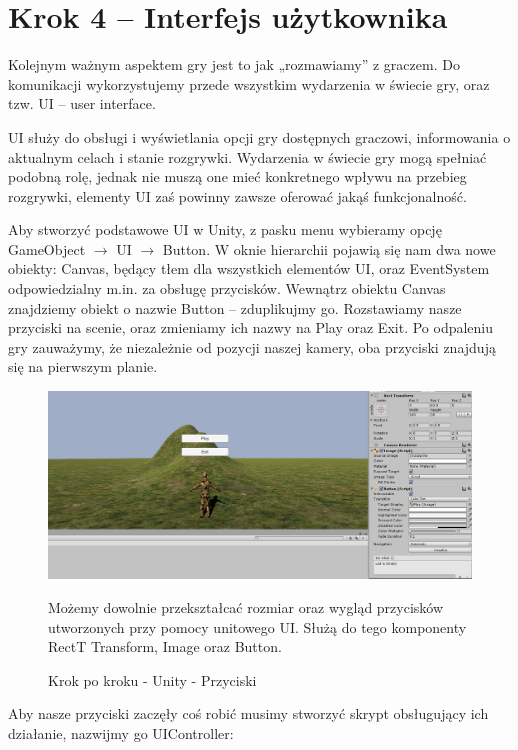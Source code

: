 \documentclass[openright]{xmgr}
\begin{document}
\section{Krok 4 – Interfejs użytkownika}

Kolejnym ważnym aspektem gry jest to jak „rozmawiamy” z graczem. Do komunikacji wykorzystujemy przede wszystkim wydarzenia w świecie gry, oraz tzw. UI – user interface.

UI służy do obsługi i wyświetlania opcji gry dostępnych graczowi, informowania o aktualnym celach i stanie rozgrywki. Wydarzenia w świecie gry mogą spełniać podobną rolę, jednak nie muszą one mieć konkretnego wpływu na przebieg rozgrywki, elementy UI zaś powinny zawsze oferować jakąś funkcjonalność.

Aby stworzyć podstawowe UI w Unity, z pasku menu wybieramy opcję GameObject $\rightarrow$ UI $\rightarrow$ Button. W oknie hierarchii pojawią się nam dwa nowe obiekty: Canvas, będący tłem dla wszystkich  elementów UI, oraz EventSystem odpowiedzialny m.in. za obsługę przycisków. Wewnątrz obiektu Canvas znajdziemy obiekt o nazwie Button – zduplikujmy go. Rozstawiamy nasze przyciski na scenie, oraz zmieniamy ich nazwy na Play oraz Exit. Po odpaleniu gry zauważymy, że niezależnie od pozycji naszej kamery, oba przyciski znajdują się na pierwszym planie.

\newpage
\begin{figure}[!htb]
    \begin{center}
    \includegraphics[scale=0.25]{Screeny/UnityKrokPoKroku/krok4_buttony.png}
    \end{center}
    \caption{Krok po kroku - Unity - Przyciski}
Możemy dowolnie przekształcać rozmiar oraz wygląd przycisków utworzonych przy pomocy unitowego UI. Służą do tego komponenty RectT Transform, Image oraz Button.
\end{figure}

Aby nasze przyciski zaczęły coś robić musimy stworzyć skrypt obsługujący ich działanie, nazwijmy go UIController:
\end{document}
